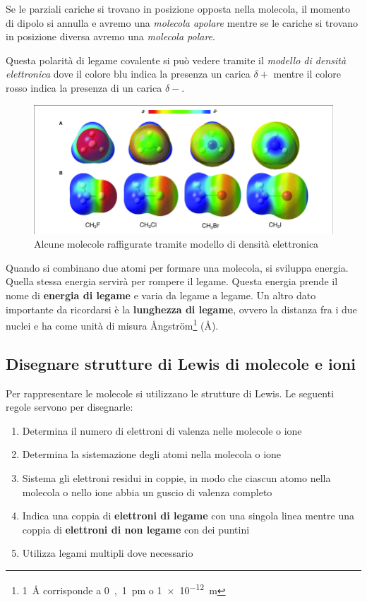 Se le parziali cariche si trovano in posizione opposta nella molecola, il momento di dipolo si annulla e avremo una \textit{molecola apolare} mentre se le cariche si trovano in posizione diversa avremo una \textit{molecola polare}.


Questa polarità di legame covalente si può vedere tramite il \textit{modello di densità elettronica} dove il colore blu indica la presenza un carica \(\delta+\) mentre il colore rosso indica la presenza di un carica \(\delta-\).

\begin{figure}[H]
	\includegraphics[width=\textwidth,trim={3cm 0 2cm 1cm},clip,]{immagini/electron density model.png}
	\caption{Alcune molecole raffigurate tramite modello di densità elettronica}
\end{figure}

Quando si combinano due atomi per formare una molecola, si sviluppa energia. Quella stessa energia servirà per rompere il legame. Questa energia prende il nome di \textbf{energia di legame} e varia da legame a legame. Un altro dato importante da ricordarsi è la \textbf{lunghezza di legame}, ovvero la distanza fra i due nuclei e ha come unità di misura {\AA}ngstr\"{o}m\footnote{\si{1 \angstrom} corrisponde a \si{0,1\pm} o \si{\qty{1e-12}\m}} (\si{\angstrom}).

\subsection{Disegnare strutture di Lewis di molecole e ioni}
Per rappresentare le molecole si utilizzano le strutture di Lewis. Le seguenti regole servono per disegnarle:
\begin{enumerate}
	\item Determina il numero di elettroni di valenza nelle molecole o ione
	\item Determina la sistemazione degli atomi nella molecola o ione
	\item  Sistema gli elettroni residui in coppie, in modo che ciascun atomo nella molecola o nello ione abbia un guscio di valenza completo
	\item Indica una coppia di \textbf{elettroni di legame} con una singola linea mentre una coppia di \textbf{ elettroni di non legame} con dei puntini
	\item Utilizza legami multipli dove necessario
\end{enumerate}

